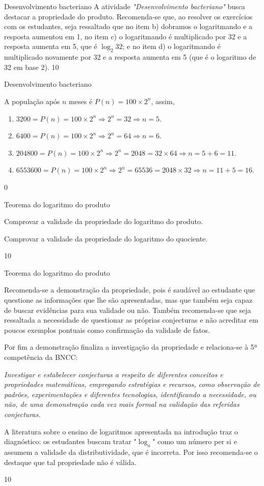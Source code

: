 \clearmargin
\begin{sugestions}{Desenvolvimento bacteriano}
{
	A atividade \textit{"Desenvolvimento bacteriano"} busca destacar a propriedade do produto. Recomenda-se que, ao resolver os exercícios com os estudantes, seja ressaltado que no item b) dobramos o logaritmando e a resposta aumentou em 1, no item c) o logaritmando é multiplicado por 32 e a resposta aumenta em 5, que é $\log_2 32$; e no item d) o logaritmando é multiplicado novamente por 32 e a resposta aumenta em 5 (que é o logaritmo de 32 em base 2).
}{1}{0}
\end{sugestions}
\begin{answer}{Desenvolvimento bacteriano}
{
	A população após $n$ meses é $P(n) = 100 \times 2^n$, assim,
	\begin{enumerate}[label = \alph*)]
	\item $3200 = P(n) = 100 \times 2^n \Rightarrow 2^n = 32 \Rightarrow n=5$.
	\item $6400 = P(n) = 100 \times 2^n \Rightarrow 2^n = 64 \Rightarrow n=6$.
	\item $204800 = P(n) = 100 \times 2^n \Rightarrow 2^n = 2048 = 32 \times 64 \Rightarrow n=5+6=11$.
	\item $6553600 = P(n) = 100 \times 2^n \Rightarrow 2^n = 65536 = 2048 \times 32 \Rightarrow n=11+5=16$.
	\end{enumerate}
}{0}
\end{answer}
\def\currentcolor{session4}
\begin{objectives}{Teorema do logaritmo do produto}
{
	Comprovar a validade da propriedade do logaritmo do produto.

	Comprovar a validade da propriedade do logaritmo do quociente.
}{1}{0}
\end{objectives}
\begin{sugestions}{Teorema do logaritmo do produto}
{
	Recomenda-se a demonstração da propriedade, pois é saudável ao estudante que questione as informações que lhe são apresentadas, mas que também seja capaz de buscar evidências para sua validade ou não. Também recomenda-se que seja ressaltada a necessidade de questionar as próprias conjecturas e não acreditar em poucos exemplos pontuais como confirmação da validade de fatos.

	Por fim a demonstração finaliza a investigação da propriedade e relaciona-se à 5ª competência da BNCC:

	\textit{Investigar e estabelecer conjecturas a respeito de diferentes conceitos e propriedades matemáticas, empregando estratégias e recursos, como observação de padrões, experimentações e diferentes tecnologias, identificando a necessidade, ou não, de uma demonstração cada vez mais formal na validação das referidas conjecturas.}

	A literatura sobre o ensino de logaritmos apresentada na introdução traz o diagnóstico: os estudantes buscam tratar "$\log_a$" como um número per si e assumem a validade da distributividade, que é incorreta. Por isso recomenda-se o destaque que tal propriedade não é válida.
}{1}{0}
\end{sugestions}

